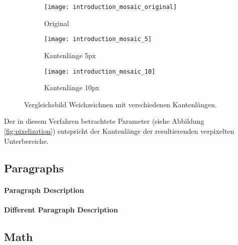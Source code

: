 \documentclass[
12pt, %
a4paper, %
oneside, %
headinclude,footinclude, %
BCOR5mm, %
german]{scrartcl}
\begin{document}
\begin{figure}[h]
    \centering
    \begin{subfigure}{0.3\textwidth}
        \texttt{[image: introduction\_mosaic\_original]}
        \caption{Original}
    \end{subfigure}
    \begin{subfigure}{0.3\textwidth}
        \texttt{[image: introduction\_mosaic\_5]}
        \caption{Kantenlänge 5px}
    \end{subfigure}
    \begin{subfigure}{0.3\textwidth}
        \texttt{[image: introduction\_mosaic\_10]}
        \caption{Kantenlänge 10px}
    \end{subfigure}

    \caption{Vergleichsbild Weichzeichnen mit verschiedenen Kantenlängen.}
    \label{fig:pixelization}
\end{figure}

Der in diesem Verfahren betrachtete Parameter (siehe Abbildung  \vref*{fig:pixelization}) entspricht der Kantenlänge der resultierenden verpixelten Unterbereiche.






\subsection{Paragraphs}

\lipsum[6] %

\paragraph{Paragraph Description} \lipsum[7] %

\paragraph{Different Paragraph Description} \lipsum[8] %


\subsection{Math}

\lipsum[4] %
\end{document}
